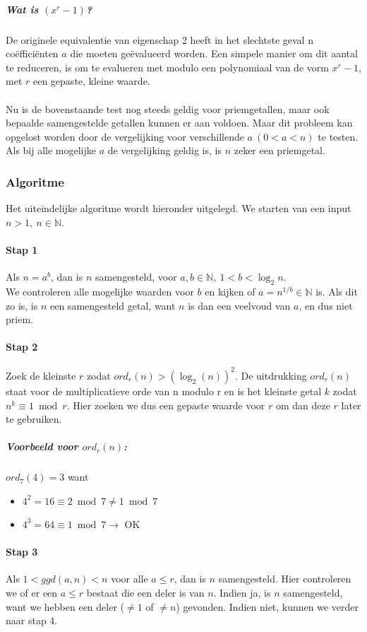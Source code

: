 \documentclass[11pt]{article}
\begin{document}
\subparagraph{Wat is $(x^r-1)$?}
De originele equivalentie van eigenschap 2 heeft in het slechtste geval n coëfficiënten $a$ die moeten geëvalueerd worden. Een simpele manier om dit aantal te reduceren, is om te evalueren met modulo een polynomiaal van de vorm $x^r-1$, met $r$ een gepaste, kleine waarde.
\\\\
Nu is de bovenstaande test nog steeds geldig voor priemgetallen, maar ook bepaalde samengestelde getallen kunnen er aan voldoen. Maar dit probleem kan opgelost worden door de vergelijking voor verschillende $a\ (0 < a < n)$ te testen. Als bij alle mogelijke $a$ de vergelijking geldig is, is $n$ zeker een priemgetal.

\pagebreak

\subsubsection{Algoritme}
Het uiteindelijke algoritme wordt hieronder uitgelegd. We starten van een input $n > 1,\ n \in \mathbb{N}$.

\paragraph{Stap 1}
Als $n = a^b$, dan is $n$ samengesteld, voor $a,b \in \mathbb{N},\ 1 < b < \log_2{n}$.\\
We controleren alle mogelijke waarden voor $b$ en kijken of $a=n^{1/b} \in \mathbb{N}$ is. Als dit zo is, is $n$ een samengesteld getal, want $n$ is dan een veelvoud van $a$, en dus niet priem.

\paragraph{Stap 2}
Zoek de kleinste $r$ zodat $ord_r(n) > (\log_2(n))^2$. De uitdrukking $ord_r(n)$ staat voor de multiplicatieve orde van n modulo r en is het kleinste getal $k$ zodat $n^k \equiv 1 \bmod{r}$. Hier zoeken we dus een gepaste waarde voor $r$ om dan deze $r$ later te gebruiken. 

\subparagraph{Voorbeeld voor $ord_r(n)$:}
$ord_7(4)=3$ want
\begin{itemize}
	\item $4^2 = 16 \equiv 2 \bmod{7} \ne 1 \bmod{7}$
	\item $4^3 = 64 \equiv 1 \bmod{7} \rightarrow$ OK
\end{itemize}

\paragraph{Stap 3}
Als $1 < ggd(a,n) < n$ voor alle $a \le r$, dan is $n$ samengesteld. Hier controleren we of er een $a \le r$ bestaat die een deler is van $n$. Indien ja, is $n$ samengesteld, want we hebben een deler ($\ne 1$ of $\ne n$) gevonden. Indien niet, kunnen we verder naar stap 4.
\end{document}
